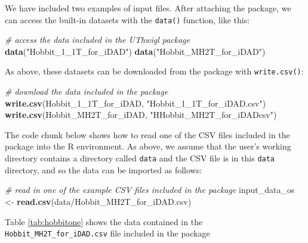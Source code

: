 \documentclass[]{elsarticle} %
\newenvironment{Shaded}{\begin{snugshade}}{\end{snugshade}}
\newcommand{\CommentTok}[1]{\textcolor[rgb]{0.56,0.35,0.01}{\textit{#1}}}
\newcommand{\DecValTok}[1]{\textcolor[rgb]{0.00,0.00,0.81}{#1}}
\newcommand{\KeywordTok}[1]{\textcolor[rgb]{0.13,0.29,0.53}{\textbf{#1}}}
\newcommand{\NormalTok}[1]{#1}
\newcommand{\StringTok}[1]{\textcolor[rgb]{0.31,0.60,0.02}{#1}}
\begin{document}
We have included two examples of input files. After attaching the package, we can access the built-in datasets with the \texttt{data()} function, like this:

\begin{Shaded}
\begin{Highlighting}[]
\CommentTok{\# access the data included in the UThwigl package}
\KeywordTok{data}\NormalTok{(}\StringTok{"Hobbit\_1\_1T\_for\_iDAD"}\NormalTok{)}
\KeywordTok{data}\NormalTok{(}\StringTok{"Hobbit\_MH2T\_for\_iDAD"}\NormalTok{)}
\end{Highlighting}
\end{Shaded}

As above, these datasets can be downloaded from the package with \texttt{write.csv()}:

\begin{Shaded}
\begin{Highlighting}[]
\CommentTok{\# download the data included in the package}
\KeywordTok{write.csv}\NormalTok{(Hobbit\_}\DecValTok{1}\NormalTok{\_1T\_for\_iDAD, }\StringTok{"Hobbit\_1\_1T\_for\_iDAD.csv"}\NormalTok{)}
\KeywordTok{write.csv}\NormalTok{(Hobbit\_MH2T\_for\_iDAD, }\StringTok{"HHobbit\_MH2T\_for\_iDADcsv"}\NormalTok{)}
\end{Highlighting}
\end{Shaded}

The code chunk below shows how to read one of the CSV files included in the package into the R environment. As above, we assume that the user's working directory contains a directory called \texttt{data} and the CSV file is in this \texttt{data} directory, and so the data can be imported as follows:

\begin{Shaded}
\begin{Highlighting}[]
\CommentTok{\# read in one of the example CSV files included in the package}
\NormalTok{input\_data\_os \textless{}{-}}
\StringTok{  }\KeywordTok{read.csv}\NormalTok{(}\StringTok{\textquotesingle{}data/Hobbit\_MH2T\_for\_iDAD.csv\textquotesingle{}}\NormalTok{)}
\end{Highlighting}
\end{Shaded}

\newpage

Table \ref{tab:hobbitone} shows the data contained in the \texttt{Hobbit\_MH2T\_for\_iDAD.csv} file included in the package
\end{document}
